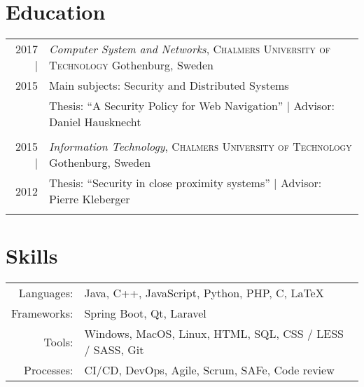 \documentclass[a4paper,10pt]{scrartcl} %
\begin{document}

\section{Education}

\begin{tabular}{r|p{15cm}}	
2017 |	        & \emph{Computer System and Networks}, \textsc{Chalmers University of Technology} \hfill Gothenburg, Sweden \\
2015			        & \footnotesize{Main subjects: Security and Distributed Systems} \\
\phantom{abcdefghijklm}	& \footnotesize{Thesis: ``A Security Policy for Web Navigation'' | Advisor: Daniel Hausknecht} \\
\multicolumn{2}{c}{} \\


2015 |      	& \emph{Information Technology}, \textsc{Chalmers University of Technology} \hfill Gothenburg, Sweden \\
2012			& \footnotesize{Thesis: ``Security in close proximity systems'' | Advisor: Pierre Kleberger} \\
\multicolumn{2}{c}{} \\

\end{tabular}


\section{Skills}

\begin{tabular}{rp{15cm}}
\phantom{abcde} Languages: 		    & Java, C++, JavaScript, Python, PHP, C, \LaTeX \\
Frameworks:	                        & Spring Boot, Qt, Laravel \\
Tools:	                            & Windows, MacOS, Linux, HTML, SQL, CSS / LESS / SASS, Git \\
Processes:                          & CI/CD, DevOps, Agile, Scrum, SAFe, Code review 
\end{tabular}


\newpage
\end{document}
